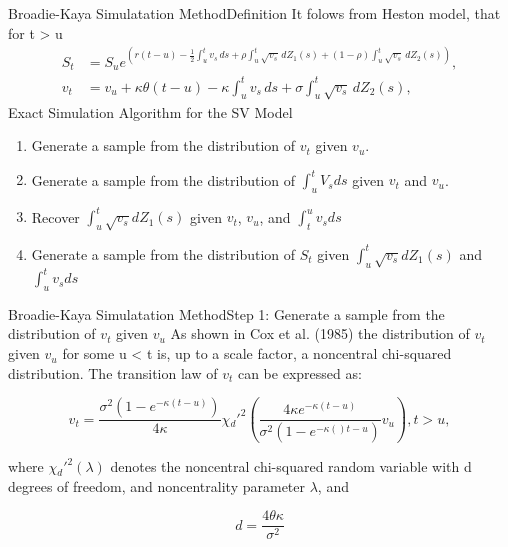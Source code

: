 \begin{frame}{Broadie-Kaya Simulatation Method}{Definition}
    It folows from Heston model, that for t > u
    \begin{align}
         S_t &= S_u e^{\left( r(t-u)-\frac{1}{2} \int_{u}^{t} v_s \, ds  + \rho\int_{u}^{t} \sqrt{v_s} \, dZ_1(s) + (1-\rho)\int_{u}^{t} \sqrt{v_s} \, dZ_2(s)  \right)}, \label{BK:Price_int} \\
         v_t &= v_u + \kappa\theta(t-u) - \kappa \int_{u}^{t} v_s \, ds + \sigma\int_{u}^{t} \sqrt{v_s} \, dZ_2(s), \label{BK:Vol_int}
    \end{align}
    Exact Simulation Algorithm for the SV Model
    \begin{enumerate}
        \item[Step 1] Generate a sample from the distribution of $v_t$ given $v_u$.
        \item[Step 2] Generate a sample from the distribution of $\int_{u}^t V_s ds$ given $v_t$ and $v_u$.
        \item[Step 3] Recover $\int_{u}^t \sqrt{v_s} dZ_1(s)$ given $v_t$, $v_u$, and
        $\int_{t}^u v_s ds$
        \item[Step 4] Generate a sample from the distribution of $S_t$ given $\int_{u}^t \sqrt{v_s} dZ_1(s)$ and $\int_{u}^t v_s ds$
    \end{enumerate}
\end{frame}

\begin{frame}{Broadie-Kaya Simulatation Method}{Step 1: Generate a sample from the distribution of $v_t$ given $v_u$}
    As shown in Cox et al. (1985) the distribution of $v_t$ given $v_u$ for some u < t is, up to a  scale factor, a noncentral chi-squared distribution. The transition law of $v_t$ can be expressed as:

    \begin{equation}
        v_t = \frac{\sigma^2(1-e^{-\kappa(t-u)})}{4\kappa}\chi{}_d'^{2}\left(\frac{4\kappa e^{-\kappa(t-u)}}{\sigma^2(1-e^{-\kappa()t-u})} v_u  \right), t > u , \label{BK:vol_law}
    \end{equation}

    where $\chi{}_d'^{2}(\lambda)$ denotes the noncentral chi-squared random
    variable with d degrees of freedom, and noncentrality
    parameter $\lambda$, and

    \begin{equation}
        d = \frac{4\theta\kappa}{\sigma^2} \label{BK:vol_law:parameter}
    \end{equation}
    
\end{frame}


